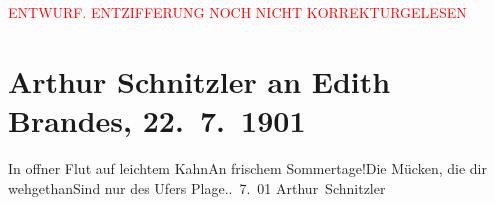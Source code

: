 
\begin{center}
            \textcolor{red}{ENTWURF. ENTZIFFERUNG NOCH NICHT KORREKTURGELESEN}
                      \end{center}
            
               \section[Arthur Schnitzler an Edith Brandes, 22. 7. 1901]{ Arthur Schnitzler an Edith Brandes, 22. 7. 1901}\nopagebreak{}\rehead{ }\begin{ledgroupsized}[t]{13cm}\normalsize\beginnumbering{} \toendnotes[C]{\smallbreak\pagebreak[2]} \stanza{}{\pb}In offner Flut auf leichtem Kahn\newverse{}An frischem Sommertage!\newverse{}Die Mücken, die dir wehgethan\newverse{}Sind nur des Ufers Plage.\stanzaend{}. 7. 01{ }\spacefill\mbox{Arthur Schnitzler}\pend{}\endnumbering{}\end{ledgroupsized}  \newcommand{\dateiname}{L01151}\newcommand{\titel}{Arthur Schnitzler an Edith Brandes, 22. 7. 1901}\newcommand{\editorInnen}{Martin Anton Müller und Gerd-Hermann Susen}
      